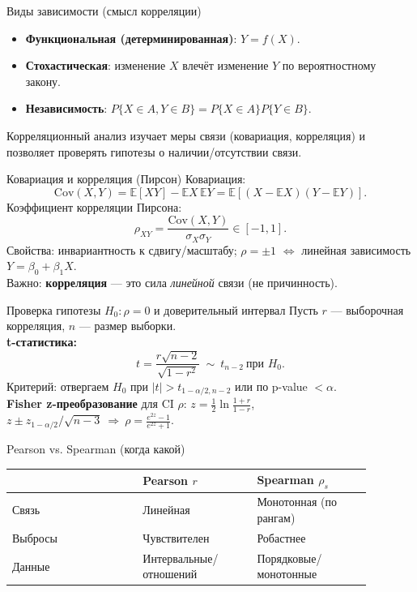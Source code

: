 \documentclass{beamer}
\newcommand{\E}{\mathbb{E}}
\begin{document}
\begin{frame}{Виды зависимости (смысл корреляции)}
\begin{itemize}
  \item \textbf{Функциональная (детерминированная)}: $Y=f(X)$.
  \item \textbf{Стохастическая}: изменение $X$ влечёт изменение $Y$ по вероятностному закону.
  \item \textbf{Независимость}: $P\{X\in A, Y\in B\}=P\{X\in A\}P\{Y\in B\}$.
\end{itemize}
Корреляционный анализ изучает меры связи (ковариация, корреляция) и позволяет проверять гипотезы о наличии/отсутствии связи.
\end{frame}

\begin{frame}{Ковариация и корреляция (Пирсон)}
Ковариация: \[
\mathrm{Cov}(X,Y)=\E[XY]-\E X\,\E Y=\E[(X-\E X)(Y-\E Y)].
\]
Коэффициент корреляции Пирсона:
\[
\rho_{XY}=\frac{\mathrm{Cov}(X,Y)}{\sigma_X\sigma_Y}\in[-1,1].
\]
Свойства: инвариантность к сдвигу/масштабу; $\rho=\pm 1$ $\Leftrightarrow$ линейная зависимость $Y=\beta_0+\beta_1 X$.\\
Важно: \textbf{корреляция} — это сила \emph{линейной} связи (не причинность).
\end{frame}


\begin{frame}{Проверка гипотезы $H_0:\rho=0$ и доверительный интервал}
Пусть $r$ — выборочная корреляция, $n$ — размер выборки.\\[2pt]
\textbf{t-статистика:} \[
t=\frac{r\sqrt{n-2}}{\sqrt{1-r^2}}\ \sim\ t_{n-2}\ \text{при } H_0.
\]
Критерий: отвергаем $H_0$ при $|t|>t_{1-\alpha/2,n-2}$ или по p-value $<\alpha$.\\[6pt]
\textbf{Fisher z-преобразование} для CI $\rho$: $z=\tfrac12\ln\frac{1+r}{1-r}$,\\
$z\pm z_{1-\alpha/2}/\sqrt{n-3}\ \Rightarrow\ \rho=\frac{e^{2z}-1}{e^{2z}+1}$.
\end{frame}


\begin{frame}{Pearson vs. Spearman (когда какой)}
\begin{tabular}{@{}p{0.32\linewidth}p{0.28\linewidth}p{0.28\linewidth}@{}}
\toprule
 & \textbf{Pearson $r$} & \textbf{Spearman $\rho_s$} \\
\midrule
Связь & Линейная & Монотонная (по рангам) \\
Выбросы & Чувствителен & Робастнее \\
Данные & Интервальные/отношений & Порядковые/монотонные \\
\bottomrule
\end{tabular}
\end{frame}
\end{document}
